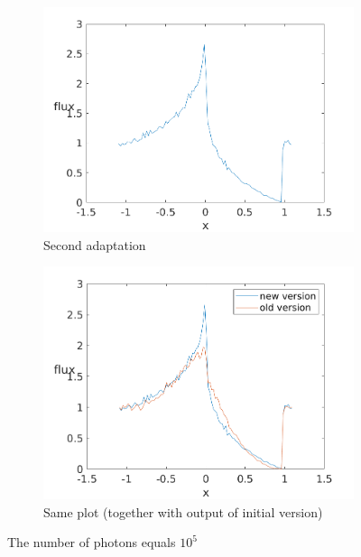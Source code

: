 \documentclass[../main/main.tex]{subfiles}
\begin{document}
\begin{figure}[!htbp]
\centering
\begin{subfigure}{.5\textwidth}
\includegraphics[width=1\textwidth]{../../introductory_exercises/P_Cygni_profile_UV_resonance/data/npot5xk0100alpha0beta1test2.png}
\caption{Second adaptation}
\end{subfigure}%
\begin{subfigure}{.5\textwidth}
\includegraphics[width=1\textwidth]{../../introductory_exercises/P_Cygni_profile_UV_resonance/data/npot5xk0100alpha0beta1test20.png}
\caption{Same plot (together with output of initial version)}
\end{subfigure}
\caption{The number of photons equals $10^{5}$}
\label{Pcyg_isotropic_scattering}
\end{figure}
\end{document}
